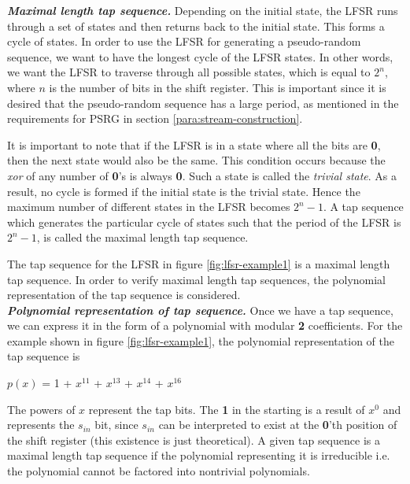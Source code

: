 \noindent \textit{\textbf{Maximal length tap sequence.}} Depending on the initial state, the LFSR runs through a set of states and then returns back to the initial state. This forms a cycle of states. In order to use the LFSR for generating a pseudo-random sequence, we want to have the longest cycle of the LFSR states. In other words, we want the LFSR to traverse through all possible states, which is equal to $2^n$, where $n$ is the number of bits in the shift register. This is important since it is desired that the pseudo-random sequence has a large period, as mentioned in the requirements for PSRG in section \ref{para:stream-construction}.

It is important to note that if the LFSR is in a state where all the bits are \textbf{0}, then the next state would also be the same. This condition occurs because the \textit{xor} of any number of \textbf{0}'s is always \textbf{0}. Such a state is called the \textit{trivial state}. As a result, no cycle is formed if the initial state is the trivial state. Hence the maximum number of different states in the LFSR becomes $2^n-1$. A tap sequence which generates the particular cycle of states such that the period of the LFSR is $2^n-1$, is called the maximal length tap sequence. 

The tap sequence for the LFSR in figure \ref{fig:lfsr-example1} is a maximal length tap sequence. In order to verify maximal length tap sequences, the polynomial representation of the tap sequence is considered.\\

\noindent \textit{\textbf{Polynomial representation of tap sequence.}} Once we have a tap sequence, we can express it in the form of a polynomial with modular \textbf{2} coefficients. For the example shown in figure \ref{fig:lfsr-example1}, the polynomial representation of the tap sequence is

\begin{center}
$p(x)$ =  1 + $x^{11}$ + $x^{13}$ + $x^{14}$ + $x^{16}$
\end{center}

The powers of $x$ represent the tap bits. The \textbf{1} in the starting is a result of $x^0$ and represents the $s_{in}$ bit, since $s_{in}$ can be interpreted to exist at the \textbf{0}'th position of the shift register (this existence is just theoretical). A given tap sequence is a maximal length tap sequence if the polynomial representing it is irreducible i.e. the polynomial cannot be factored into nontrivial polynomials.


